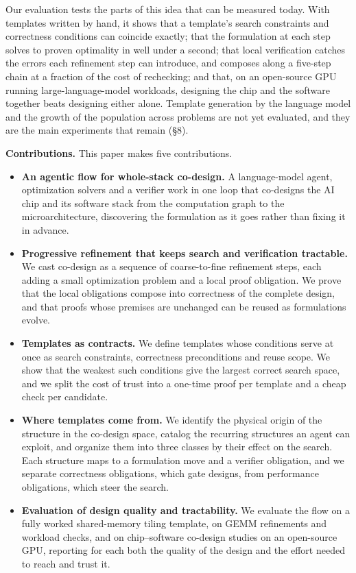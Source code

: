 \documentclass[11pt]{article}
\providecommand{\tightlist}{\setlength{\itemsep}{0pt}\setlength{\parskip}{0pt}}
\begin{document}
Our evaluation tests the parts of this idea that can be measured today. With templates written by hand, it shows that a template's search constraints and correctness conditions can coincide exactly; that the formulation at each step solves to proven optimality in well under a second; that local verification catches the errors each refinement step can introduce, and composes along a five-step chain at a fraction of the cost of rechecking; and that, on an open-source GPU running large-language-model workloads, designing the chip and the software together beats designing either alone. Template generation by the language model and the growth of the population across problems are not yet evaluated, and they are the main experiments that remain (§8).

\textbf{Contributions.} This paper makes five contributions.

\begin{itemize}
\tightlist
\item
  \textbf{An agentic flow for whole-stack co-design.} A language-model agent, optimization solvers and a verifier work in one loop that co-designs the AI chip and its software stack from the computation graph to the microarchitecture, discovering the formulation as it goes rather than fixing it in advance.
\item
  \textbf{Progressive refinement that keeps search and verification tractable.} We cast co-design as a sequence of coarse-to-fine refinement steps, each adding a small optimization problem and a local proof obligation. We prove that the local obligations compose into correctness of the complete design, and that proofs whose premises are unchanged can be reused as formulations evolve.
\item
  \textbf{Templates as contracts.} We define templates whose conditions serve at once as search constraints, correctness preconditions and reuse scope. We show that the weakest such conditions give the largest correct search space, and we split the cost of trust into a one-time proof per template and a cheap check per candidate.
\item
  \textbf{Where templates come from.} We identify the physical origin of the structure in the co-design space, catalog the recurring structures an agent can exploit, and organize them into three classes by their effect on the search. Each structure maps to a formulation move and a verifier obligation, and we separate correctness obligations, which gate designs, from performance obligations, which steer the search.
\item
  \textbf{Evaluation of design quality and tractability.} We evaluate the flow on a fully worked shared-memory tiling template, on GEMM refinements and workload checks, and on chip--software co-design studies on an open-source GPU, reporting for each both the quality of the design and the effort needed to reach and trust it.
\end{itemize}
\end{document}
